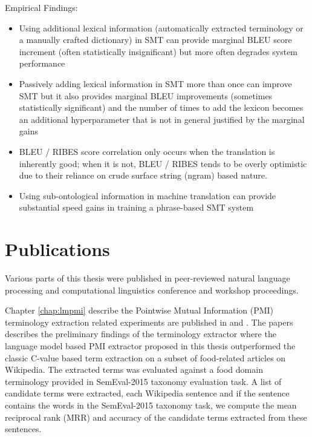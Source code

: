Empirical Findings:

\begin{itemize}
\item Using additional lexical information (automatically extracted terminology or a manually crafted dictionary) in SMT can provide marginal BLEU score increment (often statistically insignificant) but more often degrades system performance
\item Passively adding lexical information in SMT more than once can improve SMT but it also provides marginal BLEU improvements (sometimes statistically significant) and the number of times to add the lexicon becomes an additional hyperparameter that is not in general justified by the marginal gains
\item BLEU / RIBES score correlation only occurs when the translation is inherently good; when it is not, BLEU / RIBES tends to be overly optimistic due to their reliance on crude surface string (ngram) based nature.
\item Using sub-ontological information in machine translation can provide substantial speed gains in training a phrase-based SMT system 
\end{itemize}



\section{Publications}

Various parts of this thesis were published in peer-reviewed natural language processing and computational linguistics conference and workshop proceedings. 

Chapter \ref{chap:lmpmi} describe the Pointwise Mutual Information (PMI) terminology extraction related experiments are published in \citet{lilingexperttechreport} and \citet{lilingexpertworkshop}. The papers describes the preliminary findings of the terminology extractor where the language model based PMI extractor proposed in this thesis outperformed the classic C-value based term extraction on a subset of food-related articles on Wikipedia. The extracted terms was evaluated against a food domain terminology provided in SemEval-2015 taxonomy evaluation task. A list of candidate terms were extracted, each Wikipedia sentence and if the sentence contains the words in the SemEval-2015 taxonomy task, we compute the mean reciprocal rank (MRR) and accuracy of the candidate terms extracted from these sentences. 


